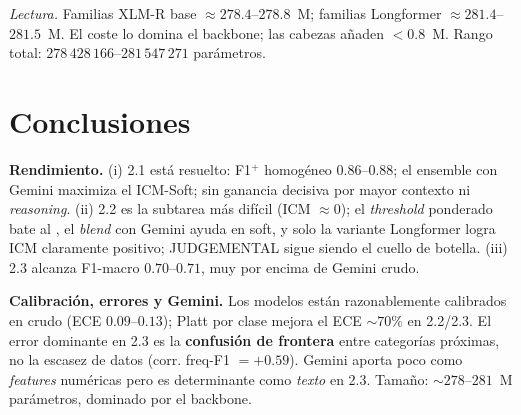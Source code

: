 \documentclass[11pt,a4paper]{article}
\newcommand{\code}[1]{\texttt{\detokenize{#1}}}
\begin{document}
\noindent\emph{Lectura.} Familias XLM-R base $\approx278.4$--$278.8$~M; familias Longformer
$\approx281.4$--$281.5$~M. El coste lo domina el backbone; las cabezas añaden $<0.8$~M. Rango
total: $278\,428\,166$--$281\,547\,271$ parámetros.

\section{Conclusiones}
\textbf{Rendimiento.} (i) 2.1 está resuelto: F1$^{+}$ homogéneo $0.86$--$0.88$; el ensemble con
Gemini maximiza el ICM-Soft; sin ganancia decisiva por mayor contexto ni \emph{reasoning}. (ii)
2.2 es la subtarea más difícil (ICM $\approx0$); el \emph{threshold} ponderado bate al
\code{argmax}, el \emph{blend} con Gemini ayuda en soft, y solo la variante Longformer logra ICM
claramente positivo; JUDGEMENTAL sigue siendo el cuello de botella. (iii) 2.3 alcanza F1-macro
$0.70$--$0.71$, muy por encima de Gemini crudo.

\textbf{Calibración, errores y Gemini.} Los modelos están razonablemente calibrados en crudo (ECE
$0.09$--$0.13$); Platt por clase mejora el ECE $\sim70\%$ en 2.2/2.3. El error dominante en 2.3 es
la \textbf{confusión de frontera} entre categorías próximas, no la escasez de datos (corr.
freq-F1 $=+0.59$). Gemini aporta poco como \emph{features} numéricas pero es determinante como
\emph{texto} en 2.3. Tamaño: $\sim278$--$281$~M parámetros, dominado por el backbone.

\end{document}
